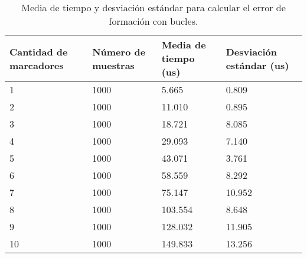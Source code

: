 \begin{table}[H]
	\centering
	\resizebox{\textwidth}{!} {
	\begin{tabular}{|l|l|l|l|}
		\hline
		\textbf{Cantidad de marcadores} & \textbf{Número de muestras} & \textbf{Media de tiempo (us)} & \textbf{Desviación estándar (us)} \\ \hline
		1                               & 1000                        & 5.665                         & 0.809                             \\ \hline
		2                               & 1000                        & 11.010                        & 0.895                             \\ \hline
		3                               & 1000                        & 18.721                        & 8.085                             \\ \hline
		4                               & 1000                        & 29.093                        & 7.140                             \\ \hline
		5                               & 1000                        & 43.071                        & 3.761                             \\ \hline
		6                               & 1000                        & 58.559                        & 8.292                             \\ \hline
		7                               & 1000                        & 75.147                        & 10.952                            \\ \hline
		8                               & 1000                        & 103.554                       & 8.648                             \\ \hline
		9                               & 1000                        & 128.032                       & 11.905                            \\ \hline
		10                              & 1000                        & 149.833                       & 13.256                            \\ \hline
	\end{tabular}}
	\caption{Media de tiempo y desviación estándar para calcular el error de formación con bucles.}
	\label{cuadro:tiempos_error_for}
\end{table}

